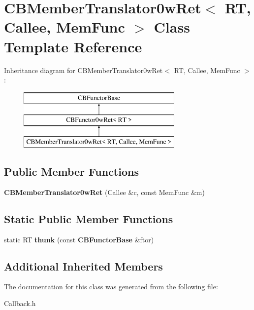 \section{C\+B\+Member\+Translator0w\+Ret$<$ RT, Callee, Mem\+Func $>$ Class Template Reference}
\label{classCBMemberTranslator0wRet}
Inheritance diagram for C\+B\+Member\+Translator0w\+Ret$<$ RT, Callee, Mem\+Func $>$\+:\begin{figure}[H]
\begin{center}
\leavevmode
\includegraphics[height=3.000000cm]{classCBMemberTranslator0wRet}
\end{center}
\end{figure}
\subsection*{Public Member Functions}
\begin{DoxyCompactItemize}
\item 
{\bfseries C\+B\+Member\+Translator0w\+Ret} (Callee \&c, const Mem\+Func \&m)\label{classCBMemberTranslator0wRet_a009f4acc5619fd7cc15e9090eac4a170}

\end{DoxyCompactItemize}
\subsection*{Static Public Member Functions}
\begin{DoxyCompactItemize}
\item 
static RT {\bfseries thunk} (const {\bf C\+B\+Functor\+Base} \&ftor)\label{classCBMemberTranslator0wRet_a40506f0ca66be1d46686507963391617}

\end{DoxyCompactItemize}
\subsection*{Additional Inherited Members}


The documentation for this class was generated from the following file\+:\begin{DoxyCompactItemize}
\item 
Callback.\+h\end{DoxyCompactItemize}
